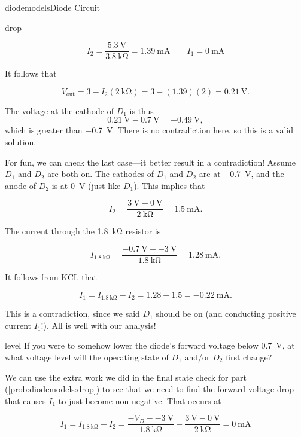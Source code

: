 \begin{mainquestion}{diodemodels}{Diode Circuit}
\begin{partquestion}{drop}
\begin{answer}
\[
I_2
=
\frac{\qty{5.3}{\volt}}{\qty{3.8}{\kilo\ohm}}
=
\qty{1.39}{\milli\ampere}
\qquad
I_1 = \qty{0}{\milli\ampere}
\]

It follows that

\[
V_{\mathrm{out}}
=
3
-
I_2\left(\qty{2}{\kilo\ohm}\right)
=
3
-
(1.39)\left(2\right)
=
\qty{0.21}{\volt}.
\]

The voltage at the cathode of $D_1$ is thus
\[
\qty{0.21}{\volt}-\qty{0.7}{\volt}=\qty{-0.49}{\volt},
\]
which is greater than \qty{-0.7}{\volt}. There is no contradiction here, so this is a valid solution.

For fun, we can check the last case—it better result in a contradiction! Assume $D_1$ and $D_2$ are both on. The cathodes of $D_1$ and $D_2$ are at \qty{-0.7}{\volt}, and the anode of $D_2$ is at \qty{0}{\volt} (just like $D_1$). This implies that

\[
I_2
=
\frac{\qty{3}{\volt}-\qty{0}{\volt}}
{\qty{2}{\kilo\ohm}}
=
\qty{1.5}{\milli\ampere}.
\]

The current through the \qty{1.8}{\kilo\ohm} resistor is

\[
I_{\qty{1.8}{\kilo\ohm}}
=
\frac{\qty{-0.7}{\volt}-\qty{-3}{\volt}}
{\qty{1.8}{\kilo\ohm}}
=
\qty{1.28}{\milli\ampere}.
\]

It follows from KCL that

\[
I_1
=
I_{\qty{1.8}{\kilo\ohm}}-I_2
=
1.28-1.5
=
\qty{-0.22}{\milli\ampere}.
\]

This is a contradiction, since we said $D_1$ should be on (and conducting positive current $I_1$!). All is well with our analysis!
\end{answer}
\end{partquestion}

\begin{partquestion}{level}
{If you were to somehow lower the diode’s forward voltage below \qty{0.7}{\volt}, at what voltage level will the operating state of $D_1$ and/or $D_2$ first change?}

\begin{answer}
We can use the extra work we did in the final state check for part (\cref{prob:diodemodels:drop}) to see that we need to find the forward voltage drop that causes $I_1$ to just become non-negative. That occurs at

\[
I_1
=
I_{\qty{1.8}{\kilo\ohm}}
-
I_2
=
\frac{-V_D-\qty{-3}{\volt}}{\qty{1.8}{\kilo\ohm}}
-
\frac{\qty{3}{\volt}-\qty{0}{\volt}}{\qty{2}{\kilo\ohm}}
=
\qty{0}{\milli\ampere}
\]


\end{answer}
\end{partquestion}
\end{mainquestion}
